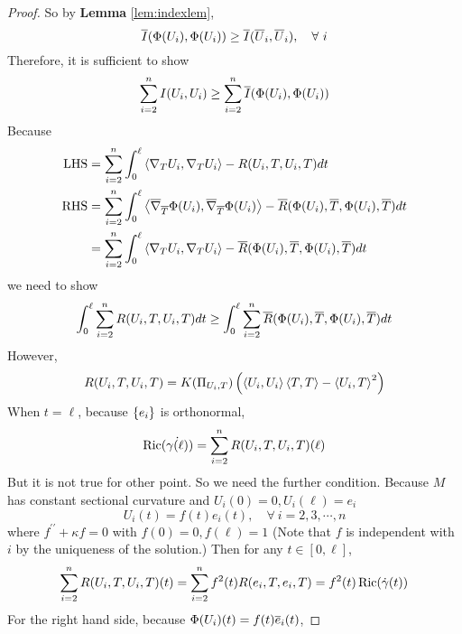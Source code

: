\begin{enumerate}[label=\arabic{*}]
\begin{proof}
		So by \textbf{Lemma} \ref{lem:indexlem},
		\begin{equation*}
			\overline{I}(\Phi(U_i),\Phi(U_i)) \geq \overline{I}(\overline{U}_i,\overline{U}_i),\quad \forall~i
		\end{equation*}
		Therefore, it is sufficient to show
		\begin{equation*}
			\sum_{i=2}^n I(U_i,U_i) \geq \sum_{i=2}^n \overline{I}(\Phi(U_i),\Phi(U_i))
		\end{equation*}
		Because 
		\begin{equation*}
			\begin{aligned}
				\operatorname{LHS} &= \sum_{i=2}^n \int_0^\ell \left\langle \nabla_TU_i,\nabla_TU_i \right\rangle - R(U_i,T,U_i,T)dt \\
				\operatorname{RHS} &= \sum_{i=2}^n \int_0^\ell \left\langle \overline{\nabla}_{\overline{T}}\Phi(U_i),\overline{\nabla}_{\overline{T}}\Phi(U_i) \right\rangle - \overline{R}(\Phi(U_i),{\overline{T}},\Phi(U_i),{\overline{T}})dt \\
				&= \sum_{i=2}^n \int_0^\ell \left\langle \nabla_TU_i,\nabla_TU_i \right\rangle - \overline{R}(\Phi(U_i),{\overline{T}},\Phi(U_i),{\overline{T}})dt
			\end{aligned}
		\end{equation*}
		we need to show
		\begin{equation*}
			\int_0^\ell \sum_{i=2}^n R(U_i,T,U_i,T)dt \geq \int_0^\ell \sum_{i=2}^n \overline{R}(\Phi(U_i),{\overline{T}},\Phi(U_i),{\overline{T}})dt
		\end{equation*}
		However,
		\begin{equation*}
			R(U_i,T,U_i,T) = K(\Pi_{U_i,T})\left(\left\langle U_i,U_i \right\rangle\left\langle T,T \right\rangle-\left\langle U_i,T \right\rangle^2\right)
		\end{equation*}
		When $t=\ell$, because $\left\{e_i\right\}$ is orthonormal,
		\begin{equation*}
			\operatorname{Ric}(\dot{\gamma(\ell)}) = \sum_{i=2}^n R(U_i,T,U_i,T)(\ell)
		\end{equation*}
		But it is not true for other point. So we need the further condition. Because $M$ has constant sectional curvature and $U_i(0) = 0,U_i(\ell) = e_i$
		\begin{equation*}
			U_i(t) = f(t)e_i(t),\quad \forall~i=2,3,\cdots,n
		\end{equation*}
		where $f^{\prime\prime} + \kappa f = 0$ with $f(0)=0,f(\ell) = 1$ (Note that $f$ is independent with $i$ by the uniqueness of the solution.) Then for any $t \in [0,\ell]$,
		\begin{equation*}
			\sum_{i=2}^nR(U_i,T,U_i,T)(t) = \sum_{i=2}^nf^2(t) R(e_i,T,e_i,T) = f^2(t)\operatorname{Ric}(\dot{\gamma}(t))
		\end{equation*}
		For the right hand side, because $\Phi(U_i)(t) = f(t)\overline{e}_i(t)$,

\end{proof}
\end{enumerate}
